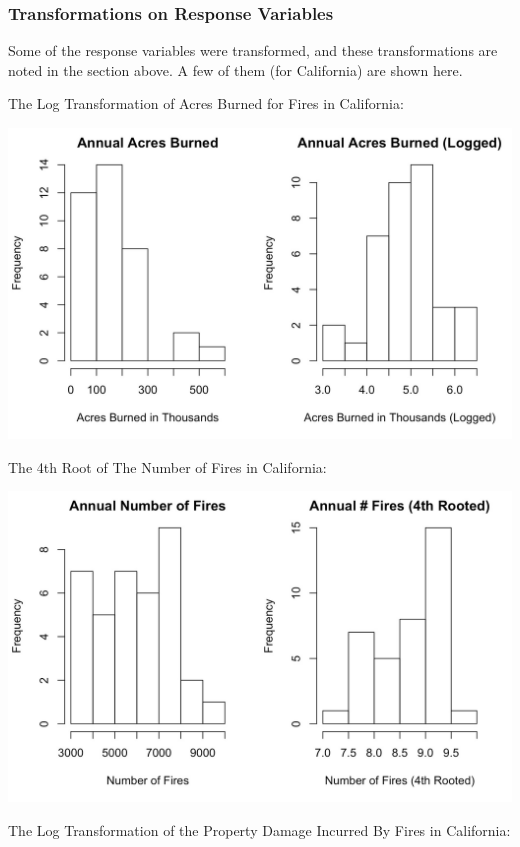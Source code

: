 \documentclass[10pt,]{article}
\begin{document}
\subsubsection{Transformations on Response
Variables}\label{transformations-on-response-variables}

Some of the response variables were transformed, and these
transformations are noted in the section above. A few of them (for
California) are shown here.

The Log Transformation of Acres Burned for Fires in California:

\includegraphics{./images/acres_burned_trans.jpeg}

\newpage

The 4th Root of The Number of Fires in California:

\includegraphics{./images/num_fires_trans.jpeg}

The Log Transformation of the Property Damage Incurred By Fires in
California:
\end{document}
